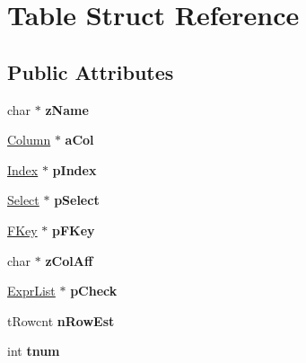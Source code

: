 \hypertarget{struct_table}{\section{Table Struct Reference}
\label{struct_table}
}
\subsection*{Public Attributes}
\begin{DoxyCompactItemize}
\item 
\hypertarget{struct_table_a20ca62607d6da596b1016b76cf677809}{char $\ast$ {\bfseries z\-Name}}\label{struct_table_a20ca62607d6da596b1016b76cf677809}

\item 
\hypertarget{struct_table_a87ec3b706ecf9545bd9ed582a12ce3e7}{\hyperlink{struct_column}{Column} $\ast$ {\bfseries a\-Col}}\label{struct_table_a87ec3b706ecf9545bd9ed582a12ce3e7}

\item 
\hypertarget{struct_table_a5dffd0c9e8f0265d6a47b32bd0e6d59f}{\hyperlink{struct_index}{Index} $\ast$ {\bfseries p\-Index}}\label{struct_table_a5dffd0c9e8f0265d6a47b32bd0e6d59f}

\item 
\hypertarget{struct_table_a39d620182fe2174fc97d04094421fa60}{\hyperlink{struct_select}{Select} $\ast$ {\bfseries p\-Select}}\label{struct_table_a39d620182fe2174fc97d04094421fa60}

\item 
\hypertarget{struct_table_a37ccce5ee6d530001d49c82788c6616d}{\hyperlink{struct_f_key}{F\-Key} $\ast$ {\bfseries p\-F\-Key}}\label{struct_table_a37ccce5ee6d530001d49c82788c6616d}

\item 
\hypertarget{struct_table_ac95c0c7b04f2c8367beb98d386d4228f}{char $\ast$ {\bfseries z\-Col\-Aff}}\label{struct_table_ac95c0c7b04f2c8367beb98d386d4228f}

\item 
\hypertarget{struct_table_a4513ad39c4adad36fdf5dd3c6cb70a12}{\hyperlink{struct_expr_list}{Expr\-List} $\ast$ {\bfseries p\-Check}}\label{struct_table_a4513ad39c4adad36fdf5dd3c6cb70a12}

\item 
\hypertarget{struct_table_a909f316fb8c4f86771ae1b5e55c23230}{t\-Rowcnt {\bfseries n\-Row\-Est}}\label{struct_table_a909f316fb8c4f86771ae1b5e55c23230}

\item 
\hypertarget{struct_table_aebe1abbfb2fd4b5e5dff8e74a4f3c890}{int {\bfseries tnum}}\label{struct_table_aebe1abbfb2fd4b5e5dff8e74a4f3c890}


\end{DoxyCompactItemize}
